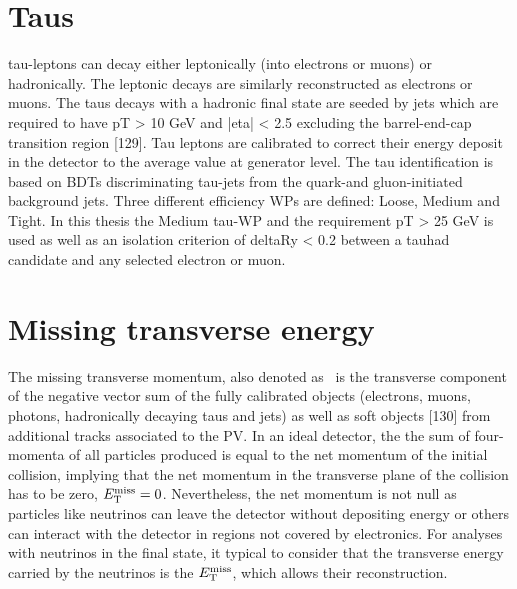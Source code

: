 \section{Taus}

tau-leptons can decay either leptonically (into electrons or muons) or hadronically. The leptonic decays
are similarly reconstructed as electrons or muons. The taus decays with a hadronic final state are seeded
by jets which are required to have pT > 10 GeV and |eta| < 2.5 excluding the barrel-end-cap transition
region [129]. Tau leptons are calibrated to correct their energy deposit in the detector to the average
value at generator level. The tau identification is based on BDTs discriminating tau-jets from the quark-and gluon-initiated background jets. Three different efficiency WPs are defined: Loose, Medium
and Tight. In this thesis the Medium tau-WP and the requirement pT > 25 GeV is used as well as an
isolation criterion of deltaRy < 0.2 between a tauhad candidate and any selected electron or muon.

\section{Missing transverse energy}

The missing transverse momentum, also denoted as \MET\ is the transverse component of the negative vector sum of the fully calibrated objects (electrons, muons, photons, hadronically decaying taus and jets) as well
as soft objects [130] from additional tracks associated to the PV. In an ideal detector, the the sum of four-momenta of all particles produced is equal to the net momentum of the initial collision, implying that the net momentum in the transverse plane of the collision has to be zero, $E_{\text{T}}^{\text{miss}}=0$. Nevertheless, the net momentum is not null as particles like neutrinos can leave the detector without depositing energy or others can interact with the detector in regions not covered by electronics. For analyses with neutrinos in the final state, it typical to consider that the transverse energy carried by the neutrinos is the $E_{\text{T}}^{\text{miss}}$, which allows their reconstruction.
